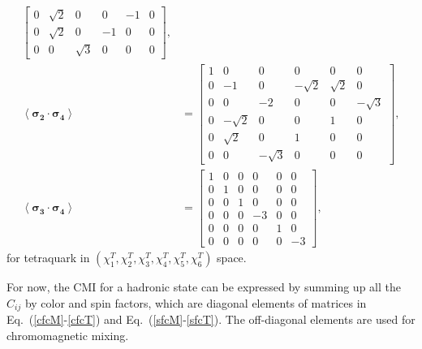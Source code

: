 \documentclass[prt,twocolumn,floatfix,nofootinbib]{revtex4}
\begin{document}
\begin{align}
\begin{bmatrix}
            0 & \sqrt{2} & 0 & 0 & -1 & 0 \\
            0 & \sqrt{2} & 0 & -1 & 0 & 0 \\
            0 & 0 & \sqrt{3} & 0 & 0 & 0
        \end{bmatrix}, \\
        \left\langle \boldsymbol{\sigma_{2}}\cdot \boldsymbol{\sigma_{4}} \right\rangle&=
        \begin{bmatrix}
            1 & 0 & 0 & 0 & 0 & 0 \\
            0 & -1 & 0 & -\sqrt{2} & \sqrt{2} & 0 \\
            0 & 0 & -2 & 0 & 0 & -\sqrt{3} \\
            0 & -\sqrt{2} & 0 & 0 & 1 & 0 \\
            0 & \sqrt{2} & 0 & 1 & 0 & 0 \\
            0 & 0 & -\sqrt{3} & 0 & 0 & 0
        \end{bmatrix}, \\
        \left\langle \boldsymbol{\sigma_{3}}\cdot \boldsymbol{\sigma_{4}} \right\rangle&=
        \begin{bmatrix}
            1 & 0 & 0 & 0 & 0 & 0 \\
            0 & 1 & 0 & 0 & 0 & 0 \\
            0 & 0 & 1 & 0 & 0 & 0 \\
            0 & 0 & 0 & -3 & 0 & 0 \\
            0 & 0 & 0 & 0 & 1 & 0 \\
            0 & 0 & 0 & 0 & 0 & -3
        \end{bmatrix}, \label{sfcT}
    \end{align}
for tetraquark in $(\chi_{1}^{T},\chi_{2}^{T},\chi_{3}^{T},\chi_{4}^{T},\chi_{5}^{T},\chi_{6}^{T})$ space.

For now, the CMI for a hadronic state can be expressed by summing up all the $C_{ij}$ by color and spin factors,
which are diagonal elements of matrices in Eq.~(\ref{cfcM}-\ref{cfcT}) and Eq.~(\ref{sfcM}-\ref{sfcT}).
The off-diagonal elements are used for chromomagnetic mixing.


\medskip
\end{document}
